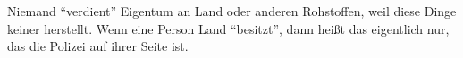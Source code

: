 Niemand ``verdient'' Eigentum an Land oder anderen Rohstoffen, weil diese Dinge keiner herstellt.
Wenn eine Person Land ``besitzt'', dann heißt das eigentlich nur, das die Polizei auf ihrer Seite ist.